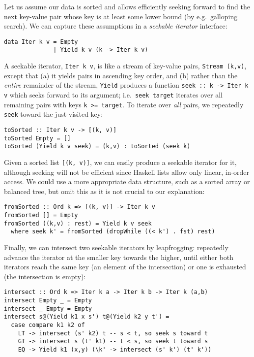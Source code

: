 \documentclass[acmsmall,screen,review,anonymous,dvipsnames,svgnames]{acmart}
\newcommand\hask[1]{\texttt{#1}}
\newcommand\ttt\texttt
\begin{document}
Let us assume our data is sorted and allows efficiently seeking forward to find the next key-value pair whose key is at least some lower bound (by e.g.\ galloping search).
We can capture these assumptions in a \emph{seekable iterator} interface:

\begin{verbatim}
data Iter k v = Empty
              | Yield k v (k -> Iter k v)
\end{verbatim}

\noindent
A seekable iterator, \hask{Iter k v}, is like a stream of key-value pairs, \hask{Stream (k,v)}, except that (a) it yields pairs in ascending key order, and (b) rather than the \emph{entire} remainder of the stream, \hask{Yield} produces a function \hask{seek :: k -> Iter k v} which seeks forward to its argument; i.e.\ \ttt{seek target} iterates over all remaining pairs with keys \ttt{k >= target}.
%
To iterate over \emph{all} pairs, we repeatedly \ttt{seek} toward the just-visited key:

\begin{verbatim}
toSorted :: Iter k v -> [(k, v)]
toSorted Empty = []
toSorted (Yield k v seek) = (k,v) : toSorted (seek k)
\end{verbatim}

\noindent
Given a sorted list \hask{[(k, v)]}, we can easily produce a seekable iterator for it, although seeking will not be efficient since Haskell lists allow only linear, in-order access.
We could use a more appropriate data structure, such as a sorted array or balanced tree, but omit this as it is not crucial to our explanation:

\begin{verbatim}
fromSorted :: Ord k => [(k, v)] -> Iter k v
fromSorted [] = Empty
fromSorted ((k,v) : rest) = Yield k v seek
  where seek k' = fromSorted (dropWhile ((< k') . fst) rest)
\end{verbatim}

\noindent
Finally, we can intersect two seekable iterators by leapfrogging: repeatedly advance the iterator at the smaller key towards the higher, until either both iterators reach the same key (an element of the intersection) or one is exhausted (the intersection is empty):

\begin{verbatim}
intersect :: Ord k => Iter k a -> Iter k b -> Iter k (a,b)
intersect Empty _ = Empty
intersect _ Empty = Empty
intersect s@(Yield k1 x s') t@(Yield k2 y t') =
  case compare k1 k2 of
    LT -> intersect (s' k2) t -- s < t, so seek s toward t
    GT -> intersect s (t' k1) -- t < s, so seek t toward s
    EQ -> Yield k1 (x,y) (\k' -> intersect (s' k') (t' k'))
\end{verbatim}
\end{document}
